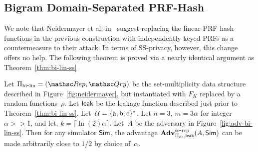 

\subsection{Bigram Domain-Separated PRF-Hash}
We note that Neidermayer et al. in~\cite{xxx} suggest replacing the linear-PRF hash functions in the previous construction with independently keyed PRFs as a countermeasure to their attack.  In terms of SS-privacy, however, this change offers no help.  The following theorem is proved via a nearly identical argument as Theorem~\ref{thm:bi-lin-ss}

\begin{theorem}\label{thm:bi-ds-ss}
Let $\setprim_{\bilin}= (\Rep, \Qry)$ be the set-multiplicity data structure described in Figure~\ref{fig:neidermayer}, but instantiated with $F_{K}$ replaced by a random functions~$\rho$.  Let ${\sf leak}$ be the leakage function described just prior to Theorem~\ref{thm:bi-lin-ss}.   Let~${\cal U}=\{\mathrm{a,b,c}\}^*$. Let $n=3$,  $m=3\alpha $ for integer $\alpha >> 1$, and let, $k = \lceil \ln(2) \alpha \rceil$.  Let~$A$ be the adversary in Figure~\ref{fig:adv-bi-lin-ss}.  Then for any simulator ${\sf Sim}$,
the advantage $\mathrm{\mathbf{Adv}}^{\mathrm{ss\mbox{-}rep}}_{\Pi_{\mathrm{ds}},{\sf leak}}(A,{\sf Sim})$ can be made arbitrarily close to $1/2$ by choice of~$\alpha$.
\end{theorem}


